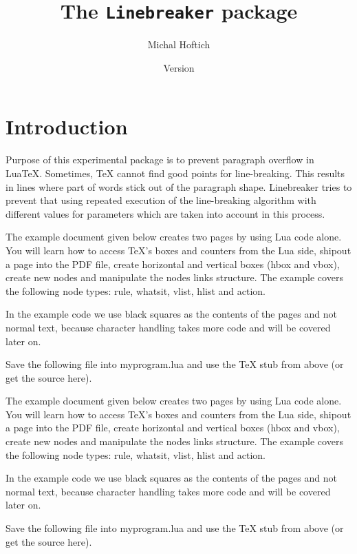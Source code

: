 \documentclass{ltxdoc}
\title{The \texttt{Linebreaker} package}
\author{Michal Hoftich\authormail{michal.h21@gmail.com}}
\date{Version \version\\\gitdate}
\begin{document}
\maketitle
\tableofcontents

\section{Introduction}

Purpose of this experimental package is to prevent paragraph overflow in
LuaTeX. Sometimes, TeX cannot find good points for line-breaking. This results
in lines where part of words stick out of the paragraph shape. Linebreaker
tries to prevent that using repeated execution of the line-breaking algorithm
with different values for parameters which are taken into account in this
process.


 \linebreakerdisable
 \parbox{220pt}{%
   \parindent=15pt
The example document given below creates two pages by using Lua code alone. You
will learn how to access TeX's boxes and counters from the Lua side, shipout a
page into the PDF file, create horizontal and vertical boxes (hbox and vbox),
create new nodes and manipulate the nodes links structure. The example covers
the following node types: rule, whatsit, vlist, hlist and action.

In the example code we use black squares as the contents of the pages and not
normal text, because character handling takes more code and will be covered
later on.

Save the following file into myprogram.lua and use the TeX stub from above (or
get the source here). 
}


\linebreakerenable


\noindent\begin{minipage}{220pt}
The example document given below creates two pages by using Lua code alone. You
will learn how to access TeX's boxes and counters from the Lua side, shipout a
page into the PDF file, create horizontal and vertical boxes (hbox and vbox),
create new nodes and manipulate the nodes links structure. The example covers
the following node types: rule, whatsit, vlist, hlist and action.

In the example code we use black squares as the contents of the pages and not
normal text, because character handling takes more code and will be covered
later on.

Save the following file into myprogram.lua and use the TeX stub from above (or
get the source here). 

\end{minipage}
\end{document}

